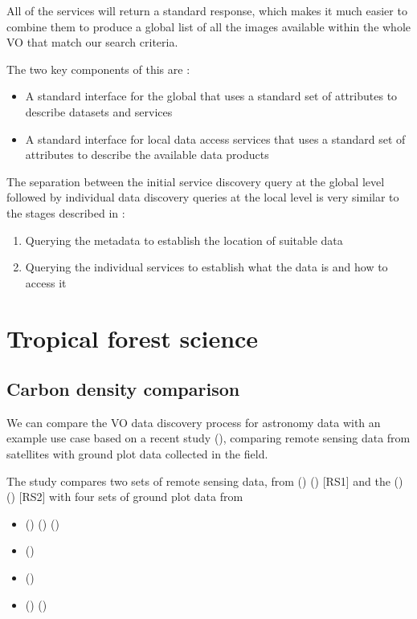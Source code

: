 \documentclass{article}
\begin{document}
All of the \cite{ivoa.sia} services will return a standard response, which makes
it much easier to combine them to produce a global list of all the images available
within the whole VO that match our search criteria.

\noindent
The two key components of this are :
\begin{itemize}
\item A standard interface for the global \cite{ivoa.reg} that uses a standard
set of attributes to describe datasets and services
\item A standard interface for local \cite{ivoa.sia} data access services that
uses a standard set of attributes to describe the available data products
\end{itemize}

The separation between the initial service discovery query at the global
level followed by individual data discovery queries at the local level
is very similar to the stages described in \cite{jones-2006} :
\begin{enumerate}
  \item Querying the metadata to establish the location of suitable data
  \item Querying the individual services to establish what the data is and how to access it
\end{enumerate}

\section{Tropical forest science}

\subsection{Carbon density comparison}

We can compare the VO data discovery process for astronomy data with an example
use case based on a recent study
 (\cite{mitchard-2014}),
comparing remote sensing data from satellites with ground plot data collected
in the field.

The study compares two sets of remote sensing data, from
 (\cite{nasa-jpl-carbon})
 (\cite{saatchi-2011}) [RS1]
and the
 (\cite{whrc})
 (\cite{baccini-2012}) [RS2]
with four sets of ground plot data from

\begin{itemize}
\item{} (\cite{rainfor}) (\cite{peacock-2007}) (\cite{malhi-2009})
\item{} (\cite{atdn})
\item{} (\cite{team})
\item{} (\cite{ppbio}) (\cite{pezzini-2012})
\end{itemize}
\end{document}
